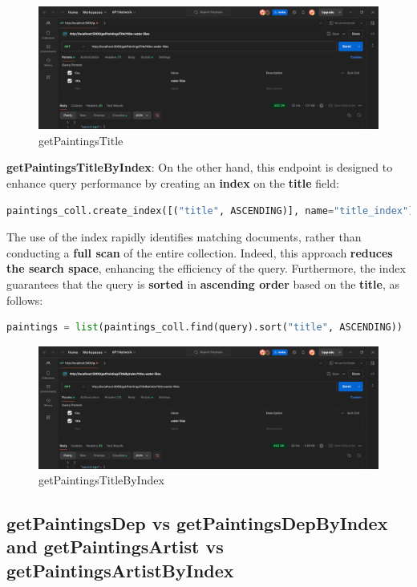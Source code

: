 \documentclass[a4paper,12pt]{article}
\begin{document}
\begin{figure}[h]
      \centering
      \includegraphics[width=1\textwidth]{images/getPaintingsTitleS.png}
      \caption{getPaintingsTitle}

\end{figure}

\textbf{getPaintingsTitleByIndex}: On the other hand, this endpoint is designed to enhance query performance by creating an \textbf{index} on the \textbf{title} field:
\begin{lstlisting}[language=Python]
paintings_coll.create_index([("title", ASCENDING)], name="title_index")
\end{lstlisting}
The use of the index rapidly identifies matching documents, rather than conducting a \textbf{full scan} of the entire collection. Indeed, this approach \textbf{reduces the search space}, enhancing the efficiency of the query. Furthermore, the index guarantees that the query is \textbf{sorted} in \textbf{ascending order} based on the \textbf{title}, as follows:
\begin{lstlisting}[language=Python]
paintings = list(paintings_coll.find(query).sort("title", ASCENDING))
\end{lstlisting}

\begin{figure}[h]
      \centering
      \includegraphics[width=1\textwidth]{images/getPaintingsTitleByIndexS.png}
      \caption{getPaintingsTitleByIndex}
\end{figure}

\subsection{getPaintingsDep vs getPaintingsDepByIndex and getPaintingsArtist vs getPaintingsArtistByIndex}
\end{document}
